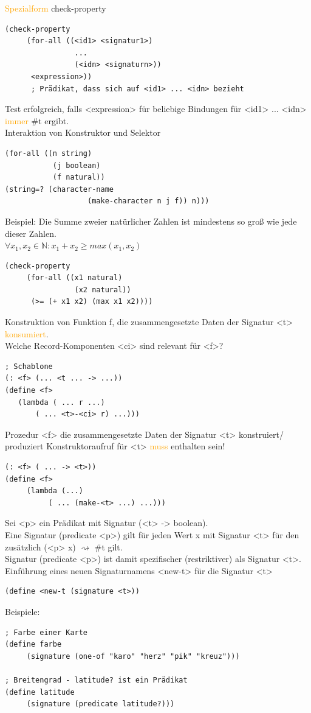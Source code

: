 \documentclass[paper=a4, fontsize=11pt]{scrartcl}
\numberwithin{equation}{section}
\numberwithin{figure}{section}
\numberwithin{table}{section}
\begin{document}
\textcolor{orange}{Spezialform} check-property
\begin{lstlisting}
(check-property
     (for-all ((<id1> <signatur1>)
                ...
                (<idn> <signaturn>))
      <expression>))      
      ; Prädikat, dass sich auf <id1> ... <idn> bezieht    
\end{lstlisting}
Test erfolgreich, falls <expression> für beliebige Bindungen für <id1> ... <idn> \textcolor{orange}{immer} \#t ergibt. \\
Interaktion von Konstruktor und Selektor 
\begin{lstlisting}
(for-all ((n string)
           (j boolean)
           (f natural))
(string=? (character-name
                   (make-character n j f)) n)))           
\end{lstlisting}
Beispiel: Die Summe zweier natürlicher Zahlen ist mindestens so groß wie jede dieser Zahlen. \\
$\forall x_{1},x_{2} \in \mathbb{N}: x_{1} + x_{2} \geq max(x_{1}, x_{2})$ 
\begin{lstlisting}
(check-property
     (for-all ((x1 natural)
                (x2 natural))
      (>= (+ x1 x2) (max x1 x2))))            
\end{lstlisting}

Konstruktion von Funktion f, die zusammengesetzte Daten der Signatur <t> \textcolor{orange}{konsumiert}. \\
Welche Record-Komponenten <ci> sind relevant für <f>? \\
\begin{lstlisting}
; Schablone
(: <f> (... <t ... -> ...))
(define <f>
   (lambda ( ... r ...) 
       ( ... <t>-<ci> r) ...)))
\end{lstlisting}

Prozedur <f> die zusammengesetzte Daten der Signatur <t> konstruiert/ produziert Konstruktoraufruf  für <t> \textcolor{orange}{muss} enthalten sein! 
\begin{lstlisting}
(: <f> ( ... -> <t>))
(define <f>
     (lambda (...)
          ( ... (make-<t> ...) ...)))
\end{lstlisting}

Sei <p> ein Prädikat mit Signatur (<t> -> boolean). \\ 
Eine Signatur (predicate <p>)  gilt für jeden Wert x mit Signatur <t> für den zusätzlich (<p> x) $\rightsquigarrow$ \#t gilt. \\
Signatur (predicate <p>) ist damit spezifischer (restriktiver) als Signatur <t>. \\
Einführung eines neuen Signaturnamens <new-t> für die Signatur <t>
\begin{lstlisting}
(define <new-t (signature <t>))
\end{lstlisting}
Beispiele:
\begin{lstlisting}
; Farbe einer Karte
(define farbe
     (signature (one-of "karo" "herz" "pik" "kreuz")))
     
; Breitengrad - latitude? ist ein Prädikat
(define latitude
     (signature (predicate latitude?)))     
\end{lstlisting}
\end{document}
